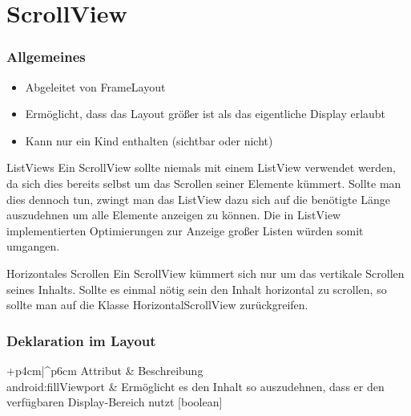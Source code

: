 \section{ScrollView}
\begin{frame}[label=scrollview]
   \frametitle{Allgemeines}
   \begin{itemize}
      \item Abgeleitet von FrameLayout 
      \item Ermöglicht, dass das Layout größer ist als das eigentliche Display erlaubt
      \item Kann nur ein Kind enthalten (sichtbar oder nicht)
   \end{itemize}

   \begin{alertblock}{ListViews}
		Ein ScrollView sollte niemals mit einem ListView verwendet werden, 
		da sich dies bereits selbst um das Scrollen seiner Elemente kümmert. 
		Sollte man dies dennoch tun, zwingt man das ListView dazu sich auf die benötigte 
		Länge auszudehnen um alle Elemente anzeigen zu können. Die in ListView 
		implementierten Optimierungen zur Anzeige großer Listen würden somit umgangen.
   \end{alertblock}

   \begin{alertblock}{Horizontales Scrollen}
		Ein ScrollView kümmert sich nur um das vertikale Scrollen seines Inhalts. Sollte 
		es einmal nötig sein den Inhalt horizontal zu scrollen, so sollte man auf die 
		Klasse HorizontalScrollView zurückgreifen.
   \end{alertblock}
\end{frame}

\begin{frame}
   \frametitle{Deklaration im Layout}

   \begin{attrDesc}{+p{4cm}|^p{6cm}}
      Attribut & Beschreibung\\
      \hline
      android:fillViewport & Ermöglicht es den Inhalt so auszudehnen, dass er den 
         verfügbaren Display-Bereich nutzt [boolean]\\
   \end{attrDesc}
   
   
\end{frame}

